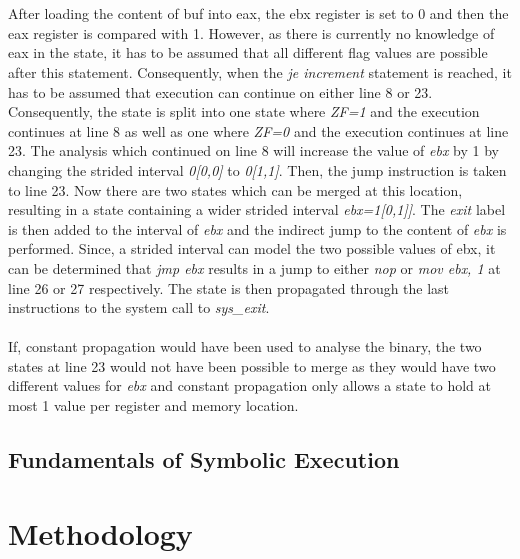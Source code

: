 \documentclass{kththesis}
\renewcommand{\it}[1]{\textit{#1}}
\begin{document}
\\ \\
After loading the content of buf into eax, the ebx register is set to 0 and then the eax register is compared with 1. However, as there is currently no knowledge of eax in the state, it has to be assumed that all different flag values are possible after this statement. Consequently, when the \it{je increment} statement is reached, it has to be assumed that execution can continue on either line 8 or 23. Consequently, the state is split into one state where \it{ZF=1} and the execution continues at line 8 as well as one where \it{ZF=0} and the execution continues at line 23. The analysis which continued on line 8 will increase the value of \it{ebx} by 1 by changing the strided interval \it{0[0,0]} to \it{0[1,1]}. Then, the jump instruction is taken to line 23. Now there are two states which can be merged at this location, resulting in a state containing a wider strided interval \it{ebx=1[0,1]]}. The \it{exit} label is then added to the interval of \it{ebx} and the indirect jump to the content of \it{ebx} is performed. Since, a strided interval can model the two possible values of ebx, it can be determined that \it{jmp ebx} results in a jump to either \it{nop} or \it{mov ebx, 1} at line 26 or 27 respectively. The state is then propagated through the last instructions to the system call to \it{sys\_exit}.
\\ \\
If, constant propagation would have been used to analyse the binary, the two states at line 23 would not have been possible to merge as they would have two different values for \it{ebx} and constant propagation only allows a state to hold at most 1 value per register and memory location.

\section{Fundamentals of Symbolic Execution}

\chapter{Methodology}\label{chap:methodlogy}

\end{document}
